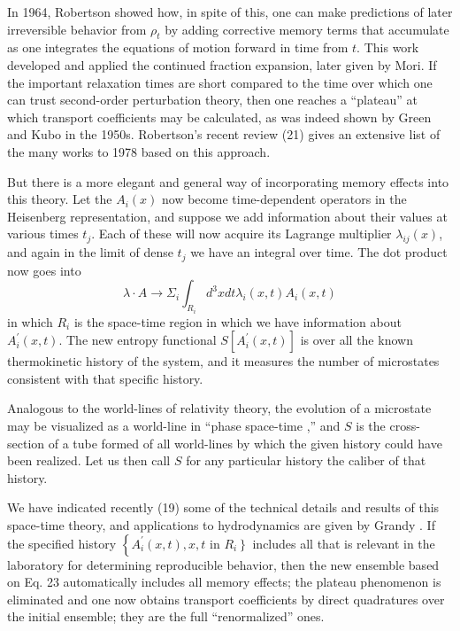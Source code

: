 \documentclass{article}
\begin{document}
In 1964, Robertson \cite{robertson1964} showed how, in spite of this, one can make predictions of later irreversible behavior from $\rho_t$ by adding corrective memory terms that accumulate as one integrates the equations of motion forward in time from $t$. This work developed and applied the continued fraction expansion, later given by Mori. If the important relaxation times are short compared to the time over which one can trust second-order perturbation theory, then one reaches a ``plateau'' at which transport coefficients may be calculated, as was indeed shown by Green and Kubo in the 1950s. Robertson's recent review (21) gives an extensive list of the many works to 1978 based on this approach.

But there is a more elegant and general way of incorporating memory effects into this theory. Let the $A_i(x)$ now become time-dependent operators in the Heisenberg representation, and suppose we add information about their values at various times $t_j$. Each of these will now acquire its Lagrange multiplier $\lambda_{i j}(x)$, and again in the limit of dense $t_j$ we have an integral over time. The dot product now goes into
$$
\lambda \cdot A \rightarrow \Sigma_i \int_{R_i} d^3 x d t \lambda_i(x, t) A_i(x, t)
$$
in which $R_i$ is the space-time region in which we have information about $A_i^{\prime}(x, t)$. The new entropy functional $S\left[A_i^{\prime}(x, t)\right]$ is over all the known thermokinetic history of the system, and it measures the number of microstates consistent with that specific history.

Analogous to the world-lines of relativity theory, the evolution of a microstate may be visualized as a world-line in ``phase space-time ,'' and $S$ is the cross-section of a tube formed of all world-lines by which the given history could have been realized. Let us then call $S$ for any particular history the caliber of that history.

We have indicated recently (19) some of the technical details and results of this space-time theory, and applications to hydrodynamics are given by Grandy \cite{grandy1980}. If the specified history $\left\{A_i^{\prime}(x, t), x, t\right.$ in $\left.R_i\right\}$ includes all that is relevant in the laboratory for determining reproducible behavior, then the new ensemble based on Eq. 23 automatically includes all memory effects; the plateau phenomenon is eliminated and one now obtains transport coefficients by direct quadratures over the initial ensemble; they are the full ``renormalized'' ones.
\end{document}
